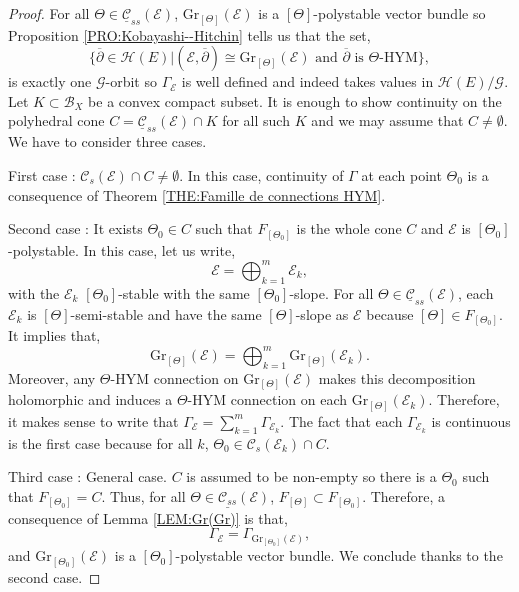 \documentclass{article}
\theoremstyle{remark}
\theoremstyle{definition}
\newcommand{\E}{\mathcal{E}}
\newcommand{\G}{\mathcal{G}}
\newcommand{\Gr}{\mathrm{Gr}}
\newcommand{\dbar}{\overline{\partial}}
\newcommand{\mC}{\mathcal{C}}
\begin{document}
\begin{proof}
For all $\Theta \in \underline{\mC}_{ss}(\E)$, $\Gr_{[\Theta]}(\E)$ is a $[\Theta]$-polystable vector bundle so Proposition \ref{PRO:Kobayashi--Hitchin} tells us that the set,
$$
\{\dbar \in \mathcal{H}(E)|(\E,\dbar) \cong \Gr_{[\Theta]}(\E) \textrm{ and $\dbar$ is $\Theta$-HYM}\},
$$
is exactly one $\G$-orbit so $\Gamma_\E$ is well defined and indeed takes values in $\mathcal{H}(E)/\G$. Let $K \subset \mathcal{B}_X$ be a convex compact subset. It is enough to show continuity on the polyhedral cone $C = \underline{\mC}_{ss}(\E) \cap K$ for all such $K$ and we may assume that $C \neq \emptyset$. We have to consider three cases.

First case : $\mC_s(\E) \cap C \neq \emptyset$. In this case, continuity of $\Gamma$ at each point $\Theta_0$ is a consequence of Theorem \ref{THE:Famille de connections HYM}.

Second case : It exists $\Theta_0 \in C$ such that $F_{[\Theta_0]}$ is the whole cone $C$ and $\E$ is $[\Theta_0]$-polystable. In this case, let us write,
$$
\E = \bigoplus_{k = 1}^m \E_k,
$$
with the $\E_k$ $[\Theta_0]$-stable with the same $[\Theta_0]$-slope. For all $\Theta \in \underline{\mC}_{ss}(\E)$, each $\E_k$ is $[\Theta]$-semi-stable and have the same $[\Theta]$-slope as $\E$ because $[\Theta] \in F_{[\Theta_0]}$. It implies that,
$$
\Gr_{[\Theta]}(\E) = \bigoplus_{k = 1}^m \Gr_{[\Theta]}(\E_k).
$$
Moreover, any $\Theta$-HYM connection on $\Gr_{[\Theta]}(\E)$ makes this decomposition holomorphic and induces a $\Theta$-HYM connection on each $\Gr_{[\Theta]}(\E_k)$. Therefore, it makes sense to write that $\Gamma_\E = \sum_{k = 1}^m \Gamma_{\E_k}$. The fact that each $\Gamma_{\E_k}$ is continuous is the first case because for all $k$, $\Theta_0 \in \mC_s(\E_k) \cap C$.

Third case : General case. $C$ is assumed to be non-empty so there is a $\Theta_0$ such that $F_{[\Theta_0]} = C$. Thus, for all $\Theta \in \underline{\mC_{ss}}(\E)$, $F_{[\Theta]} \subset F_{[\Theta_0]}$. Therefore, a consequence of Lemma \ref{LEM:Gr(Gr)} is that,
$$
\Gamma_\E = \Gamma_{\Gr_{[\Theta_0]}(\E)},
$$
and $\Gr_{[\Theta_0]}(\E)$ is a $[\Theta_0]$-polystable vector bundle. We conclude thanks to the second case.
\end{proof}
\end{document}
